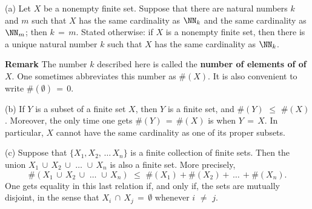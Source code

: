 \hspace*{\parindent}(a) Let $X$ be a nonempty finite set. Suppose that there are natural numbers $k$ and $m$ such that $X$
    has the same cardinality as ${\NN}_{k}$ and the same cardinality as ${\NN}_{m}$; then $k \,=\, m$.
    Stated otherwise: if $X$ is a nonempty finite set, then there is a unique natural number $k$ such that $X$ has the same cardinality as ${\NN}_{k}$.

        {\bf Remark} The number $k$ described here is called the {\bf number of elements of of $X$}.
    One sometimes abbreviates this number as $\#(X)$. It is also convenient to write $\#({\emptyset}) \,=\, 0$.

\V

        (b) If $Y$ is a subset of a finite set $X$, then $Y$ is a finite set, and $\#(Y)\,\,{\leq}\,\,\#(X)$. Moreover, the only time one gets
    $\#(Y) \,=\, \#(X)$ is when $Y \,=\, X$. In particular, $X$ cannot have the same cardinality as one of its proper subsets.

\V

        (c) Suppose that $\{X_{1},X_{2},\,{\ldots}\,X_{n}\}$ is a finite collection of finite sets.
    Then the union $X_{1}\,{\cup}\,X_{2}\,{\cup}\,\,{\ldots}\,\,{\cup}\,X_{n}$ is also a finite set. More precisely,
        \begin{displaymath}
         \#(X_{1}\,{\cup}\,X_{2}\,{\cup}\,\,{\ldots}\,\,{\cup}\,X_{n})
    \,\,{\leq}\,\,
        \#(X_{1}) + \#(X_{2}) + \,{\ldots}\,+\#(X_{n}).
        \end{displaymath}
    One gets equality in this last relation if, and only if, the sets are mutually disjoint,
    in the sense that $X_{i}\,{\cap}\,X_{j} \,=\, {\emptyset}$ whenever $i \,\,{\neq}\,\, j$.

\V

